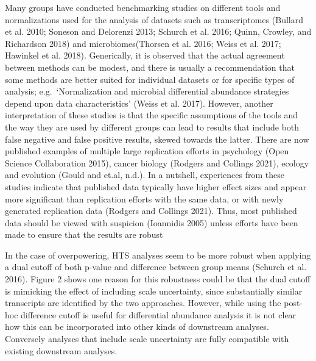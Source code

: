 \documentclass[
]{article}
\begin{document}
Many groups have conducted benchmarking studies on different tools and
normalizations used for the analysis of datasets such as transcriptomes
(Bullard et al. 2010; Soneson and Delorenzi 2013; Schurch et al. 2016;
Quinn, Crowley, and Richardson 2018) and microbiomes(Thorsen et al.
2016; Weiss et al. 2017; Hawinkel et al. 2018). Generically, it is
observed that the actual agreement between methods can be modest, and
there is usually a recommendation that some methods are better suited
for individual datasets or for specific types of analysis;
e.g.~`Normalization and microbial differential abundance strategies
depend upon data characteristics' (Weiss et al. 2017). However, another
interpretation of these studies is that the specific assumptions of the
tools and the way they are used by different groups can lead to results
that include both false negative and false positive results, skewed
towards the latter. There are now published examples of multiple large
replication efforts in psychology (Open Science Collaboration 2015),
cancer biology (Rodgers and Collings 2021), ecology and evolution (Gould
and et.al, n.d.). In a nutshell, experiences from these studies indicate
that published data typically have higher effect sizes and appear more
significant than replication efforts with the same data, or with newly
generated replication data (Rodgers and Collings 2021). Thus, most
published data should be viewed with suspicion (Ioannidis 2005) unless
efforts have been made to ensure that the results are robust

In the case of overpowering, HTS analyses seem to be more robust when
applying a dual cutoff of both p-value and difference between group
means (Schurch et al. 2016). Figure 2 shows one reason for this
robustness could be that the dual cutoff is mimicking the effect of
including scale uncertainty, since substantially similar transcripts are
identified by the two approaches. However, while using the post-hoc
difference cutoff is useful for differential abundance analysis it is
not clear how this can be incorporated into other kinds of downstream
analyses. Conversely analyses that include scale uncertainty are fully
compatible with existing downstream analyses.
\end{document}
